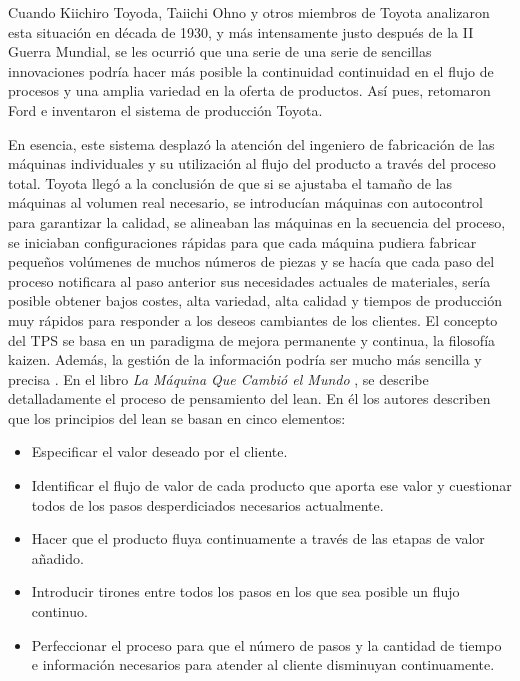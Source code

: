 Cuando Kiichiro Toyoda, Taiichi Ohno y otros miembros de Toyota analizaron esta situación en década de 1930, y más intensamente justo después de la II Guerra Mundial, se les ocurrió que una serie de una serie de sencillas innovaciones podría hacer más posible la continuidad continuidad en el flujo de procesos y una amplia variedad en la oferta de productos.
Así pues, retomaron Ford e inventaron el sistema de producción Toyota.

En esencia, este sistema desplazó la atención del ingeniero de fabricación de las máquinas individuales y su utilización al flujo del producto a través del proceso total.
Toyota llegó a la conclusión de que si se ajustaba el tamaño de las máquinas al volumen real necesario, se introducían máquinas con autocontrol para garantizar la calidad, se alineaban las máquinas en la secuencia del proceso, se iniciaban configuraciones rápidas para que cada máquina pudiera fabricar pequeños volúmenes de muchos números de piezas y se hacía que cada paso del proceso notificara al paso anterior sus necesidades actuales de materiales, sería posible obtener bajos costes, alta variedad, alta calidad y tiempos de producción muy rápidos para responder a los deseos cambiantes de los clientes.
El concepto del TPS se basa en un paradigma de mejora permanente y continua, la filosofía kaizen.
Además, la gestión de la información podría ser mucho más sencilla y precisa \cite{liker_toyota_2006}.
En el libro \textit{La Máquina Que Cambió el Mundo} \cite{womack_machine_2007}, se describe detalladamente el proceso de pensamiento del lean.
En él los autores describen que los principios del lean se basan en cinco elementos:

\begin{itemize}
    \item Especificar el valor deseado por el cliente.
    \item Identificar el flujo de valor de cada producto que aporta ese valor y cuestionar todos de los pasos desperdiciados necesarios actualmente.
    \item Hacer que el producto fluya continuamente a través de las etapas de valor añadido.
    \item Introducir tirones entre todos los pasos en los que sea posible un flujo continuo.
    \item Perfeccionar el proceso para que el número de pasos y la cantidad de tiempo e información necesarios para atender al cliente disminuyan continuamente.
\end{itemize}


